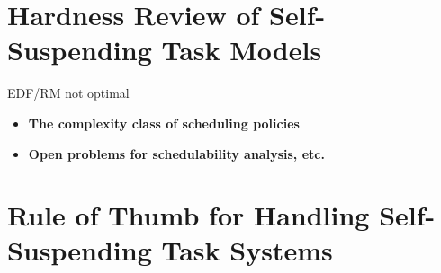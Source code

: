 \section{Hardness Review of Self-Suspending Task Models}
   EDF/RM not optimal \cite{Ridouard_2004} 
   
\begin{itemize}
\item \textbf{The complexity class of scheduling policies}
\item \textbf{Open problems for schedulability analysis, etc.}
\end{itemize}
  
\section{Rule of Thumb for Handling Self-Suspending Task Systems}